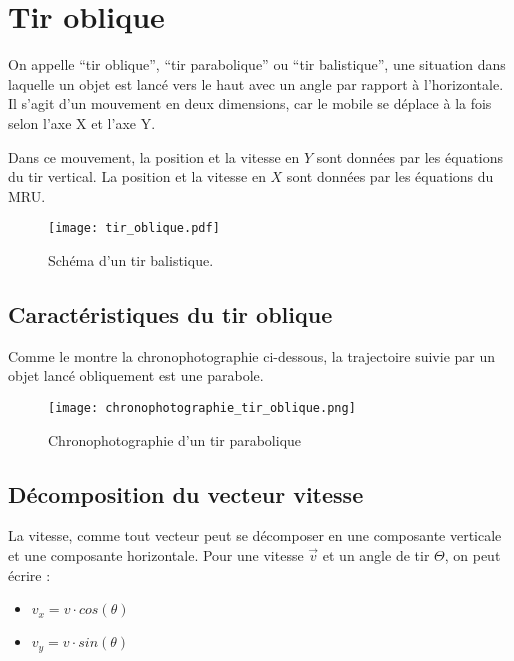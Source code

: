 \chapter{Tir oblique}
On appelle \enquote{tir oblique}, \enquote{tir parabolique} ou \enquote{tir balistique}, une situation dans laquelle un objet est lancé vers le haut avec un angle par rapport à l'horizontale. Il s'agit d'un mouvement en deux dimensions, car le mobile se déplace à la fois selon l'axe X et l'axe Y.
\begin{encadre}
    Dans ce mouvement, la position et la vitesse en \(Y\) sont données par les équations du tir vertical. La position et la vitesse en \(X\) sont données par les équations du MRU.
\end{encadre}

\begin{figure}[h!]
    \centering
    \texttt{[image: tir\_oblique.pdf]}
    \caption{Schéma d'un tir balistique.}
    \label{Schéma d'un tir balistique}
\end{figure}

\newpage

\section{Caractéristiques du tir oblique}
Comme le montre la chronophotographie ci-dessous, la trajectoire suivie par un objet lancé obliquement est une parabole.

\begin{figure}[h!]
    \centering
    \texttt{[image: chronophotographie\_tir\_oblique.png]}
    \caption{Chronophotographie d'un tir parabolique}
    \label{Chronophotographie d'un tir parabolique}
\end{figure}

\section{Décomposition du vecteur vitesse}
La vitesse, comme tout vecteur peut se décomposer en une composante verticale et une composante horizontale. Pour une vitesse \(\vec{v}\) et un angle de tir \(\Theta\), on peut écrire :
\begin{itemize}[label=\textbullet]
    \item \(v_x = v \cdot cos(\theta) \)
    \item \(v_y = v \cdot sin(\theta) \)
\end{itemize}

